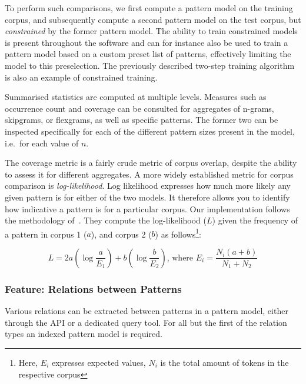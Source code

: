 \documentclass[a4paper,12pt]{article}
\begin{document}
To perform such comparisons, we first compute a pattern model on the training
corpus, and subsequently compute a second pattern model on the test corpus, but
\emph{constrained} by the former pattern model. The ability to train
constrained models is present throughout the software and can for instance also
be used to train a pattern model based on a custom preset list of patterns,
effectively limiting the model to this preselection. The previously described
two-step training algorithm is also an example of constrained training.

Summarised statistics are computed at multiple levels. Measures such as
occurrence count and coverage can be consulted for aggregates of n-grams,
skipgrams, or flexgrams, as well as specific patterns. The former two can be
inspected specifically for each of the different pattern sizes present in the
model, i.e.\ for each value of $n$.

The coverage metric is a fairly crude metric of corpus overlap, despite the
ability to assess it for different aggregates. A more widely established metric
for corpus comparison is \emph{log-likelihood}. Log likelihood expresses how
much more likely any given pattern is for either of the two models. It
therefore allows you to identify how indicative a pattern is for a particular
corpus. Our implementation follows the methodology
of~\cite{Rayson00comparingcorpora}. They compute the log-likelihood ($L$)
given the frequency of a pattern in corpus 1 ($a$), and corpus 2 ($b$) as
follows\footnote{Here, $E_i$ expresses expected values, $N_i$ is the
total amount of tokens in the respective corpus}:

\begin{equation}
L = 2a(\log \frac{a}{E_1}) + b(\log \frac{b}{E_2})\text{, where } E_i = \frac{N_i(a+b)}{N_1 + N_2} 
\end{equation}


\subsubsection{Feature: Relations between Patterns}

Various relations can be extracted between patterns in a pattern model, either
through the API or a dedicated query tool. For all but the first of the
relation types an indexed pattern model is required. 
\end{document}
